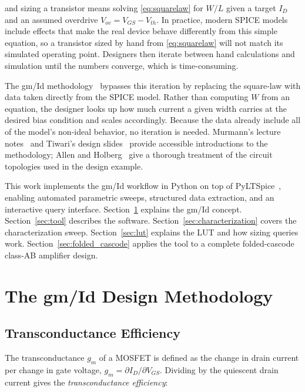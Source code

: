 \documentclass[conference]{IEEEtran}
\begin{document}
and sizing a transistor means solving \eqref{eq:squarelaw} for $W/L$ given
a target $I_D$ and an assumed overdrive $V_{ov} = V_{GS} - V_{th}$.  In
practice, modern SPICE models include effects that make the real device
behave differently from this simple equation, so a transistor sized by hand
from \eqref{eq:squarelaw} will not match its simulated operating point.
Designers then iterate between hand calculations and simulation until the
numbers converge, which is time-consuming.

The gm/Id methodology~\cite{silveira1996} bypasses this iteration by
replacing the square-law with data taken directly from the SPICE model.
Rather than computing $W$ from an equation, the designer looks up how much
current a given width carries at the desired bias condition and scales
accordingly.  Because the data already include all of the model's
non-ideal behavior, no iteration is needed.  Murmann's lecture
notes~\cite{murmann2020} and Tiwari's design slides~\cite{tiwari} provide
accessible introductions to the methodology; Allen and Holberg~\cite{allen2011}
give a thorough treatment of the circuit topologies used in the design
example.

This work implements the gm/Id workflow in Python on top of
PyLTSpice~\cite{pyltspice}, enabling automated parametric sweeps,
structured data extraction, and an interactive query interface.
Section~\ref{sec:methodology} explains the gm/Id concept.
Section~\ref{sec:tool} describes the software.
Section~\ref{sec:characterization} covers the characterization sweep.
Section~\ref{sec:lut} explains the LUT and how sizing queries work.
Section~\ref{sec:folded_cascode} applies the tool to a complete
folded-cascode class-AB amplifier design.

\section{The gm/Id Design Methodology}
\label{sec:methodology}

\subsection{Transconductance Efficiency}

The transconductance $g_m$ of a MOSFET is defined as the change in drain
current per change in gate voltage, $g_m = \partial I_D / \partial V_{GS}$.
Dividing by the quiescent drain current gives the \textit{transconductance
efficiency}:
\end{document}
